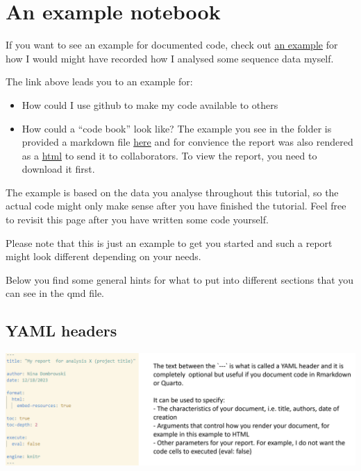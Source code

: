 \documentclass[
  letterpaper,
  DIV=11,
  numbers=noendperiod]{scrreprt}
\author{}
\date{}
\providecommand{\tightlist}{%
  \setlength{\itemsep}{0pt}\setlength{\parskip}{0pt}}\usepackage{longtable,booktabs,array}
\renewcommand*\contentsname{Table of contents}
\newcommand\contentsname{Table of contents}
\begin{document}

\renewcommand*\contentsname{Table of contents}
{
\hypersetup{linkcolor=}
\setcounter{tocdepth}{1}
\tableofcontents
}
\section{An example notebook}\label{an-example-notebook}

If you want to see an example for documented code, check out
\href{https://github.com/ndombrowski/cli_workshop/tree/main/example_doc}{an
example} for how I would might have recorded how I analysed some
sequence data myself.

The link above leads you to an example for:

\begin{itemize}
\tightlist
\item
  How could I use github to make my code available to others
\item
  How could a ``code book'' look like? The example you see in the folder
  is provided a markdown file
  \href{https://github.com/ndombrowski/cli_workshop/blob/main/example_doc/example_notebook.qmd}{here}
  and for convience the report was also rendered as a
  \href{https://github.com/ndombrowski/cli_workshop/blob/main/docs/example_doc/example_notebook.html}{html}
  to send it to collaborators. To view the report, you need to download
  it first.
\end{itemize}

The example is based on the data you analyse throughout this tutorial,
so the actual code might only make sense after you have finished the
tutorial. Feel free to revisit this page after you have written some
code yourself.

Please note that this is just an example to get you started and such a
report might look different depending on your needs.

Below you find some general hints for what to put into different
sections that you can see in the qmd file.

\subsection{YAML headers}\label{yaml-headers}

\includegraphics[width=7.84375in,height=\textheight]{../img/yaml_header.png}
\end{document}
